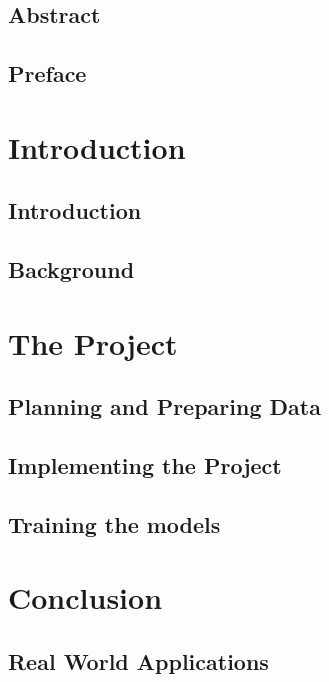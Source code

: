 \documentclass[UKenglish]{ifimaster}
\title{\problemStatement}
\subtitle{
}
\author{Joakim I. Frogner}
\begin{document}
\duoforside[dept={Department of Informatics},
program={Programming and Networks},
long]

\frontmatter{}
\chapter*{Abstract}

\tableofcontents{} 
\listoffigures{}
\listoftables{}

\chapter*{Preface}

\mainmatter{}
\part{Introduction}

\chapter{Introduction}


\chapter{Background}



\part{The Project}
\chapter{Planning and Preparing Data}


\chapter{Implementing the Project}


\chapter{Training the models}


\part{Conclusion}
\chapter{Real World Applications} 

\backmatter{}
\printbibliography
\end{document}
